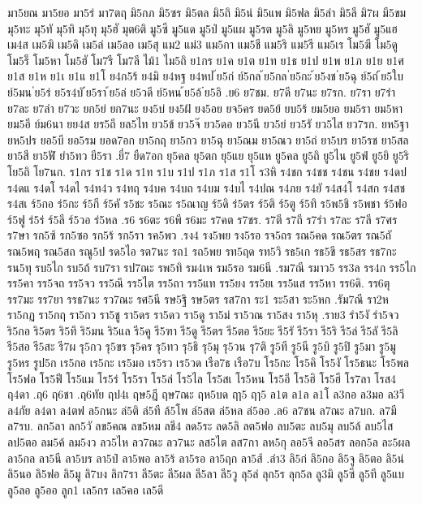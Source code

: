 {{มา5ยณ
มา5ยอ
มา5ร่
มา7ตฤ
มิ5กภ
มิ5ซร
มิ5ตล
มิ5ถิ
มิ5น่
มิ5แพ
มิ5ฟล
มิ5ลำ
มิ5ลี
มิ7ผ
มี5ขม
มุ5ทะ
มุ5ทั
มุ5ทิ
มุ5ทุ
มุ5ฮั
มุต6ติ
มู5ซี
มู5แด
มู5ป่
มู5แผ
มู5รต
มู5ลิ
มู5หย
มู5หร
มู5ฮั
มู5แฮ
เม4ส
เม5ฆิ
เม5ดิ
เม5ล่
เม5ลอ
เม5สุ
แม2
แม่3
แม5กา
แม5ชี
แม5ริ
แม5รี
แม5เร
โม5ฆี
โม5ดู
โม5ร็
โม5หา
โม5ฮั
โม7รี
โม7ลี
ไม้1
ไม5ถิ
ย1กร
ย1ค
ย1ต
ย1ท
ย1ธ
ย1ป
ย1พ
ย1ภ
ย1ย
ย1ศ
ย1ส
ย1ห
ย1เ
ย1แ
ย1โ
ย4ก5ร้
ย4มิ
ย4หฐ
ย4หป
๊ย5ก่
ย์5กล
้ย5กล
่ย5กะ
้ย5งช
่ย5ฉุ
ย์5ถ่
้ย5ใบ
ย์5มน
่ย5ร่
ย5ร4บั
่ย5รา
้ย5ล่
ย5วดี
ย์5หน
้ย5อ้
๋ย5อิ
.ย6
ย7ชม.
ย7ดี
ย7นะ
ย7รก.
ย7รา
ย7รำ
ย7ละ
ย7ลำ
ย7วะ
ยก5ย่
ยก7นะ
ยง5บ่
ยง5ฝ้
ยง5อย
ยจ5คร
ยด5ย้
ยบ5ร้
ยม5ยอ
ยม5รา
ยม5หา
ยม5อี
ย์ม6นา
ยย4ส
ยร5ถี
ยล5ไท
ยว5ข้
ยว5จ๊
ยว5ดอ
ยว5นี
ยว5ย่
ยว5รั
ยว5ไส
ยว7รก.
ยห5ฐา
ยห5ปร
ยอ5บี
ยอ5รม
ยอด7อก
ยา5กฤ
ยา5กว
ยา5ฉุ
ยา5ณม
ยา5ณว
ยา5ถ่
ยา5บร
ยา5รช
ยา5สล
ยา5สี
ยา5ฬั
ยำ5ทว
ยี5รา
.ยี่7
ยืด7อก
ยุ5คล
ยุ5ตก
ยุ5แย
ยุ5แห
ยู5คล
ยู5ถิ
ยู5ไน
ยู5ฟ่
ยู5ยิ
ยู5ริ
โย5ถิ
โย7นก.
ร1กร
ร1ช
ร1ด
ร1ท
ร1บ
ร1ป
ร1ภ
ร1ส
ร1โ
ร3หิ
ร4ชก
ร4ชช
ร4ชน
ร4ชย
ร4ดป
ร4ดแ
ร4ดโ
ร4ดไ
ร4ท4ว
ร4ทฤ
ร4บค
ร4บถ
ร4บม
ร4บไ
ร4ปณ
ร4ภย
ร4ยั
ร4ส4โ
ร4สก
ร4สช
ร4สเ
ร์5กอ
ร่5กะ
ร์5กี
ร์5คั
ร5ชะ
ร5ณะ
ร5ณาญ
ร์5ดิ
ร่5ตร
ร์5ติ
ร์5ตู
ร์5ทิ
ร5พ5ชิ
ร5พชา
ร์5ฟอ
ร์5ฟู
ร่5ร่
ร์5ลี
ร์5วอ
ร่5หล
.ร6
ร6ตะ
ร6พี
ร6มะ
ร7คต
ร7ชร.
ร7ตี
ร7ถี
ร7รำ
ร7ละ
ร7ลี
ร7ศร
ร7ษา
รก5ซ้
รก5ซอ
รก5ร้
รก5รา
รค5พว
.รง4
รง5พย
รง5รอ
รจ5ถร
รณ5คด
รณ5ตร
รณ5ถั
รณ5พฤ
รณ5สถ
รณู5ป
รด5ไอ
รต7นะ
รถ1
รถ5พย
รท5ฤด
รท5วิ
รธ5เก
รธ5ขึ
รธ5สร
รธ7กะ
รน5ทุ
รบ5ไก
รบ5ถ้
รบ7รา
รป7ณะ
รพ5ทิ
รม4เห
รม5รอ
รม6นี
.รม7ณี
รมาว5
รร3ล
รร4ก
รร5ไก
รร5คา
รร5จถ
รร5จว
รร5ณึ
รร5ไต
รร5ถา
รร5แท
รร5ยง
รร5ยเ
รร5แส
รร5หา
รร6ดิ.
รร6ตุ
รร7มะ
รร7ยา
รรธ7นะ
รว7ณะ
รศ5นี
รษ5ฐิ
รษ5ตร
รส7กา
ระ1
ระ5สา
ระ5หก
.รัม7ณี
รา2ห
รา5กฏ
รา5กฤ
รา5กว
รา5ชู
รา5ดร
รา5ดว
รา5ดู
รา5ม่
รา5วณ
รา5สง
รา5หุ
.ราย3
รำ5งั
รำ5จว
ริ5กอ
ริ5ตร
ริ5ทึ
ริ5มน
ริ5แล
รี5คู
รี5ฑา
รี5ดู
รี5ตร
รี5ตอ
รี5ยะ
รี5รั
รี5รา
รี5ริ
รี5ล่
รี5ลั
รี5ลิ
รี5สอ
รี5สะ
รี7ผ
รุ5กว
รุ5ขร
รุ5คร
รุ5ทว
รุ5ธิ
รุ5มุ
รุ5วน
รุ7ติ
รู5ที
รู5นี
รู5บิ
รู5ปิ
รู5มา
รู5มู
รู5หร
รูป5ก
เร5กอ
เร5กะ
เร5มอ
เร5รว
เร5วด
เรือ7ธ
เรือ7บ
โร5กะ
โร5คิ
โร5งั
โร5ธนะ
โร5พล
โร5ฟอ
โร5ฟี
โร5แม
โร5ร่
โร5รา
โร5ล่
โร5ไล
โร5สเ
โร5หน
โร5อี
โร5ฮิ
โร5ฮี
โร7ลา
โรส4
ฤ4ดา
.ฤ6
ฤ6ชา
.ฤ6ทัย
ฤป4เ
ฤษ5ฎี
ฤษ7ณะ
ฤห5บด
ฤา5
ฤๅ5
ล1ต
ล1ล
ล1โ
ล3กอ
ล3มอ
ล3วี
ล4กัย
ล4ดา
ล4ตฟ
ล5กนะ
ล่5ติ
ล่5ที
ล้5โพ
ล์5สต
ล่5หล
ล่5ออ
.ล6
ล7ชน
ล7ณะ
ล7บก.
ล7มี
ล7รบ.
ลก5ลา
ลก5วั
ลข5คณ
ลข5หม
ลชี4
ลด5ระ
ลด5ลิ
ลต5ฟอ
ลบ5ตะ
ลบ5มุ
ลบ5ล้
ลบ5ไส
ลป5ตอ
ลม5ค้
ลม5งว
ลว5ไห
ลว7ณะ
ลว7นะ
ลส5ไต
ลส7กา
ลห5กุ
ลอ5จี
ลอ5สร
ลอก5ล
ละ5ผล
ลา5กล
ลา5นี
ลา5บร
ลา5ป๋
ลา5พอ
ลา5ร้
ลา5รอ
ลา5ฤก
ลา5ส้
.ลำ3
ลิ5ก่
ลิ5กอ
ลิ5จู
ลิ5ตอ
ลิ5น่
ลิ5นอ
ลิ5ฟอ
ลิ5มู
ลิ7บง
ลิก7รา
ลี5ตะ
ลี5ผล
ลี5ลา
ลี5วู
ลุ5ล่
ลุก5ร
ลุก5ล
ลู3มิ
ลู5ซี
ลู5ที
ลู5แบ
ลู5ลอ
ลู5ออ
ลูก1
เล5กร
เล5คอ
เล5ดี
}}
